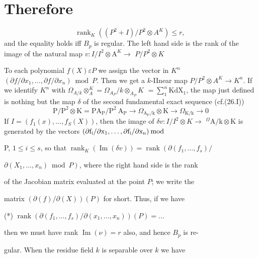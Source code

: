 \section{Therefore}
$$
\operatorname{rank}_{K}\left(\left(P^{2}+I\right) / P^{2} \otimes A^{K}\right) \leqslant r \text {, }
$$
and the equality holds iff $B_{p}$ is regular. The left hand side is the rank of the image of the natural map $v: I / I^{2} \otimes \mathrm{A}^{K} \rightarrow$ $P / P^{2} \otimes K$

To each polynomial $f(X) \varepsilon P$ we assign the vector in $K^{n}$ $\left(\partial f / \partial x_{1}, \ldots, \partial f / \partial x_{n}\right) \bmod P$. Then we get a $k$-IInear map $P / P^{2} \otimes A^{K} \rightarrow K^{n}$. If we identify $K^{n}$ with $\Omega_{A / k} \otimes_{A}^{K}=\Omega_{A_{P}} / k \otimes_{A_{P}} K$ $=\sum_{1}^{n} \mathrm{KdX}_{1}$, the map just defined is nothing but the map $\delta$ of the second fundamental exact sequence (cf.(26.I))
$$
\mathrm{P} / \mathrm{P}^{2} \otimes \mathrm{K}=\mathrm{PA}_{\mathrm{P}} / \mathrm{P}^{2} \mathrm{~A}_{\mathrm{P}} \rightarrow \Omega_{\mathrm{A}_{\mathrm{P}} / \mathrm{k}} \otimes \mathrm{K} \rightarrow \Omega_{\mathrm{K} / \mathrm{k}} \rightarrow 0
$$
If $I=\left(f_{1}(x), \ldots, f_{S}(X)\right)$, then the image of $\delta v: I / I^{2} \otimes K \rightarrow$ ${ }^{\Omega} \mathrm{A} / \mathrm{k} \otimes \mathrm{K}$ is generated by the vectors $\left(\partial \mathrm{f}_{\mathrm{i}} / \partial \mathrm{x}_{1}, \ldots, \partial \mathrm{f}_{\mathrm{i}} / \partial \mathrm{x}_{\mathrm{n}}\right) \bmod$

P, $1 \leqslant i \leqslant s$, so that $\operatorname{rank}_{K}(\operatorname{Im}(\delta v))=\operatorname{rank}\left(\partial\left(f_{1}, \ldots, f_{s}\right) /\right.$

$\left.\partial\left(X_{1}, \ldots, x_{n}\right) \bmod P\right)$, where the right hand side is the rank

of the Jacobian matrix evaluated at the point $P$; we write the

matrix $(\partial(f) / \partial(X))(P)$ for short. Thus, if we have

(*) $\operatorname{rank}\left(\partial\left(f_{1}, \ldots, f_{s}\right) / \partial\left(x_{1}, \ldots, x_{n}\right)\right)(P)=\ldots$

then we must have rank $\operatorname{Im}(\nu)=r$ also, and hence $B_{p}$ is re-

gular. When the residue field $k$ is separable over $k$ we have

